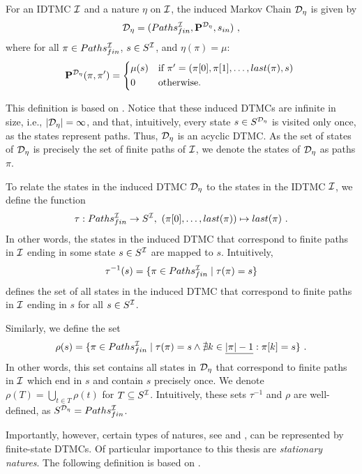 \begin{definition}\label{def:DTMC_induced_by_nature}
    For an IDTMC $\mathcal{I}$ and a nature $\eta$ on $\mathcal{I}$, the induced Markov Chain $\mathcal{D}_{\eta}$ is given by
    \[\mathcal{D}_{\eta} = (Paths^{\mathcal{I}}_{fin},\mathbf{P}^{\mathcal{D}_{\eta}},s_{in})\ ,\]
    where for all $\pi \in Paths_{fin}^{\mathcal{I}}$, $s\in S^{\mathcal{I}}$, and $\eta(\pi) = \mu$: 
    \[\PF^{\MC_{\eta}}(\pi,\pi') = \begin{cases*}
        \mu(s) & if $\pi' = (\pi[0],\pi[1],\dots,last(\pi),s)$ \\
        0 & otherwise.
    \end{cases*}
    \]
\end{definition}
This definition is based on \cite{Bibel}. Notice that these induced DTMCs are infinite in size, i.e., $|\mathcal{D}_{\eta}| = \infty$, and that, intuitively, every state $s\in S^{\mathcal{D}_{\eta}}$ is visited only once, as the states represent paths. Thus, $\mathcal{D}_\eta$ is an acyclic DTMC. As the set of states of $\mathcal{D}_{\eta}$ is precisely the set of finite paths of $\mathcal{I}$, we denote the states of $\mathcal{D}_{\eta}$ as paths $\pi$. 

To relate the states in the induced DTMC $\mathcal{D}_{\eta}$ to the states in the IDTMC $\mathcal{I}$, we define the function
\[ \tau: Paths_{fin}^\IMC \rightarrow S^\IMC,\ (\pi[0],\dots,last(\pi)) \mapsto last(\pi)\ .\]
In other words, the states in the induced DTMC that correspond to finite paths in $\mathcal{I}$ ending in some state $s\in S^{\mathcal{I}}$ are mapped to $s$. Intuitively, 
\[\tau^{-1}(s) = \{\pi \in Paths_{fin}^{\mathcal{I}} \mid \tau(\pi) = s\}\]
defines the set of all states in the induced DTMC that correspond to finite paths in $\mathcal{I}$ ending in $s$ for all $s\in S^{\mathcal{I}}$. 

Similarly, we define the set 
\[\rho(s) = \{\pi \in Paths_{fin}^{\mathcal{I}} \mid \tau(\pi) = s \land \nexists k\in \underline{|\pi|-1}: \pi[k] = s\}\ .\]
In other words, this set contains all states in $\mathcal{D}_\eta$ that correspond to finite paths in $\mathcal{I}$ which end in $s$ and contain $s$ precisely once. We denote $\rho(T) = \bigcup_{t\in T}\rho(t)$ for $T\subseteq S^{\mathcal{I}}$. Intuitively, these sets $\tau^{-1}$ and $\rho$ are well-defined, as $S^{\mathcal{D}_{\eta}} = Paths_{fin}^{\mathcal{I}}$.

Importantly, however, certain types of natures, see  and , can be represented by finite-state DTMCs.
Of particular importance to this thesis are \textit{stationary natures}. The following definition is based on \cite{Badings2025}.

